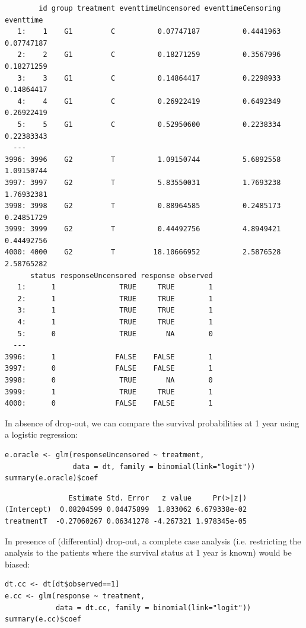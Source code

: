 \documentclass[12pt]{article}
\begin{document}
\begin{verbatim}
        id group treatment eventtimeUncensored eventtimeCensoring  eventtime
   1:    1    G1         C          0.07747187          0.4441963 0.07747187
   2:    2    G1         C          0.18271259          0.3567996 0.18271259
   3:    3    G1         C          0.14864417          0.2298933 0.14864417
   4:    4    G1         C          0.26922419          0.6492349 0.26922419
   5:    5    G1         C          0.52950600          0.2238334 0.22383343
  ---                                                                       
3996: 3996    G2         T          1.09150744          5.6892558 1.09150744
3997: 3997    G2         T          5.83550031          1.7693238 1.76932381
3998: 3998    G2         T          0.88964585          0.2485173 0.24851729
3999: 3999    G2         T          0.44492756          4.8949421 0.44492756
4000: 4000    G2         T         18.10666952          2.5876528 2.58765282
      status responseUncensored response observed
   1:      1               TRUE     TRUE        1
   2:      1               TRUE     TRUE        1
   3:      1               TRUE     TRUE        1
   4:      1               TRUE     TRUE        1
   5:      0               TRUE       NA        0
  ---                                            
3996:      1              FALSE    FALSE        1
3997:      0              FALSE    FALSE        1
3998:      0               TRUE       NA        0
3999:      1               TRUE     TRUE        1
4000:      0              FALSE    FALSE        1
\end{verbatim}

\clearpage

In absence of drop-out, we can compare the survival
probabilities at 1 year using a logistic regression:
\lstset{language=r,label= ,caption= ,captionpos=b,numbers=none}
\begin{lstlisting}
e.oracle <- glm(responseUncensored ~ treatment,
                data = dt, family = binomial(link="logit"))
summary(e.oracle)$coef
\end{lstlisting}

\begin{verbatim}
               Estimate Std. Error   z value     Pr(>|z|)
(Intercept)  0.08204599 0.04475899  1.833062 6.679338e-02
treatmentT  -0.27060267 0.06341278 -4.267321 1.978345e-05
\end{verbatim}


In presence of (differential) drop-out, a complete case analysis
(i.e. restricting the analysis to the patients where the survival
status at 1 year is known) would be biased:
\lstset{language=r,label= ,caption= ,captionpos=b,numbers=none}
\begin{lstlisting}
dt.cc <- dt[dt$observed==1]
e.cc <- glm(response ~ treatment,
            data = dt.cc, family = binomial(link="logit"))
summary(e.cc)$coef
\end{lstlisting}
\end{document}

